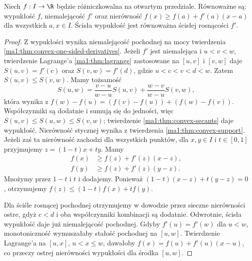 \begin{twierdzenie}
\label{ma1:thm:convex-first-derivative}
Niech $f:I\to\R$ będzie różniczkowalna na otwartym przedziale. Równoważne są: wypukłość $f$, niemalejącość $f'$ oraz nierówność $f(x)\ge f(a)+f'(a)(x-a)$ dla wszystkich $a,x\in I$. Ścisła wypukłość jest równoważna ścisłej rosnącości $f'$.
\end{twierdzenie}
\begin{proof}
Z wypukłości wynika niemalejącość pochodnej na mocy twierdzenia \ref{ma1:thm:convex-one-sided-derivatives}. Jeżeli $f'$ jest niemalejąca i $u<v<w$, twierdzenie Lagrange'a \ref{ma1:thm:lagrange} zastosowane na $[u,v]$ i $[v,w]$ daje $S(u,v)=f'(c)$ oraz $S(v,w)=f'(d)$, gdzie $u<c<v<d<w$. Zatem $S(u,v)\le S(v,w)$. Mamy tożsamość
\[
 S(u,w)=\frac{v-u}{w-u}S(u,v)+\frac{w-v}{w-u}S(v,w),
\]
która wynika z $f(w)-f(u)=(f(v)-f(u))+(f(w)-f(v))$. Współczynniki są dodatnie i sumują się do jedności, więc $S(u,v)\le S(u,w)\le S(v,w)$; twierdzenie \ref{ma1:thm:convex-secants} daje wypukłość. Nierówność stycznej wynika z twierdzenia \ref{ma1:thm:convex-support}. Jeżeli zaś ta nierówność zachodzi dla wszystkich punktów, dla $x,y\in I$ i $t\in[0,1]$ przyjmujemy $z=(1-t)x+ty$. Mamy
\[
 \begin{aligned}
 f(x)&\ge f(z)+f'(z)(x-z),\\
 f(y)&\ge f(z)+f'(z)(y-z).
 \end{aligned}
\]
Mnożymy przez $1-t$ i $t$ i dodajemy. Ponieważ $(1-t)(x-z)+t(y-z)=0$, otrzymujemy $f(z)\le(1-t)f(x)+tf(y)$.

Dla ściśle rosnącej pochodnej otrzymujemy w dowodzie przez sieczne nierówności ostre, gdyż $c<d$ i oba współczynniki kombinacji są dodatnie. Odwrotnie, ścisła wypukłość daje już niemalejącość pochodnej. Gdyby $f'(u)=f'(w)$ dla $u<w$, monotoniczność wymuszałaby stałość pochodnej na $[u,w]$. Twierdzenie Lagrange'a na $[u,x]$, $u<x\le w$, dawałoby $f(x)=f(u)+f'(u)(x-u)$, co przeczy ostrej nierówności wypukłości dla środka $[u,w]$.
\end{proof}

